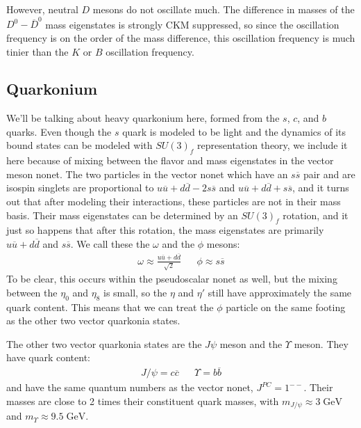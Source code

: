 \documentclass[11pt, oneside]{article}   	%
\theoremstyle{definition}
\numberwithin{equation}{subsection}		%
\begin{document}
However, neutral $D$ mesons do not oscillate much. The difference in masses of the $D^0-\overline D^0$ mass eigenstates is strongly 
CKM suppressed, so since the oscillation frequency is on the order of the mass difference, this oscillation frequency is much tinier than 
the $K$ or $B$ oscillation frequency. 

\subsection{Quarkonium}

We'll be talking about heavy quarkonium here, formed from the $s$, $c$, and $b$ quarks. Even though the $s$ quark is modeled to 
be light and the dynamics of its bound states can be modeled with $SU(3)_f$ representation theory, we include it here because of 
mixing between the flavor and mass eigenstates in the vector meson nonet. The two particles in the vector nonet which have an $s\overline s$ 
pair and are isospin singlets are proportional to $u\overline u + d\overline d - 2 s\overline s$ and $u\overline u + d\overline d + s\overline s$, 
and it turns out that after modeling their interactions, these particles are not in their mass basis. Their mass eigenstates can be determined 
by an $SU(3)_f$ rotation, and it just so happens that after this rotation, the mass eigenstates are primarily $u\overline u + d\overline d$ and 
$s\overline s$. We call these the $\omega$ and the $\phi$ mesons:
\begin{align}
	\omega\approx \frac{u\overline u + d\overline d}{\sqrt 2} && \phi \approx s\overline s
\end{align}
To be clear, this occurs within the pseudoscalar nonet as well, but the mixing between the $\eta_0$ and $\eta_8$ is small, so the 
$\eta$ and $\eta'$ still have approximately the same quark content. This means that we can treat the $\phi$ particle on the same 
footing as the other two vector quarkonia states. 

The other two vector quarkonia states are the $J\psi$ meson and the $\Upsilon$ meson. They have quark content:
\begin{align}
	J/\psi = c\overline c && \Upsilon = b\overline b
\end{align}
and have the same quantum numbers as the vector nonet, $J^{PC} = 1^{--}$. Their masses are close to 2 times their constituent 
quark masses, with $m_{J/\psi} \approx 3\;\mathrm{GeV}$ and $m_\Upsilon \approx 9.5 \;\mathrm{GeV}$. 
\end{document}
